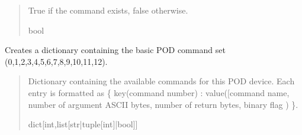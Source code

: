 \documentclass[letterpaper,10pt,english]{sphinxmanual}
\begin{document}
\begin{fulllineitems}
\begin{fulllineitems}
\begin{quote}
\begin{description}
\sphinxAtStartPar
True if the command exists, false otherwise.

\sphinxAtStartPar
bool

\end{description}\end{quote}

\end{fulllineitems}


\begin{fulllineitems}
\label{\detokenize{PodCommands:PodCommands.POD_Commands.GetBasicCommands}}
\pysigstartsignatures
{}
\pysigstopsignatures
\sphinxAtStartPar
Creates a dictionary containing the basic POD command set (0,1,2,3,4,5,6,7,8,9,10,11,12).
\begin{quote}\begin{description}
\sphinxAtStartPar
Dictionary containing the available commands for this POD                 device. Each entry is formatted as \{ key(command number) : value({[}command name, number of                 argument ASCII bytes, number of return bytes, binary flag ) \}.

\sphinxAtStartPar
dict{[}int,list{[}str|tuple{[}int{]}|bool{]}{]}

\end{description}\end{quote}

\end{fulllineitems}



\end{fulllineitems}
\end{document}
